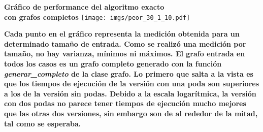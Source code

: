 \begin{center}
{\color{black}\textbf{Gráfico de performance del algoritmo exacto\\
con grafos completos}
\texttt{[image: imgs/peor\_30\_1\_10.pdf]}}
\end{center}

\par{\textbf{Cada punto en el gráfico representa la medición obtenida para
un determinado tamaño de entrada. Como se realizó una medición por tamaño, no
hay varianza, mínimos ni máximos. El grafo entrada en todos los casos es un
grafo completo generado con la función \textit{generar\_completo} de la clase
grafo. Lo primero que salta a la vista es que los tiempos de ejecución de
la versión con una poda son superiores a los de la versión sin podas.
Debido a la escala logarítmica, la versión con dos podas no parece
tener tiempos de ejecución mucho mejores que las otras dos versiones,
sin embargo son de al rededor de la mitad, tal como se esperaba.}}
